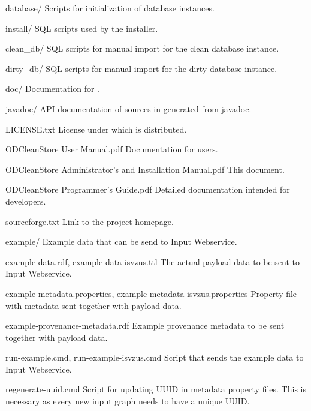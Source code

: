 \begin{dirlistbrief}
    \item[database/] Scripts for initialization of database instances.
        \begin{dirlist}
            \item[install/] SQL scripts used by the installer.
            \item[clean\_db/] SQL scripts for manual import for the clean database instance.
            \item[dirty\_db/] SQL scripts for manual import for the dirty database instance.
        \end{dirlist}
    \item[doc/] Documentation for \odcs.
        \begin{dirlist}
            \item[javadoc/] API documentation of \odcs sources in generated from javadoc.
            \item[LICENSE.txt] License under which \odcs is distributed.
            \item[ODCleanStore User Manual.pdf] Documentation for \odcs users.
            \item[ODCleanStore Administrator's and Installation Manual.pdf] This document.
            \item[ODCleanStore Programmer's Guide.pdf] Detailed documentation intended for developers.
            \item[sourceforge.txt] Link to the project homepage.
        \end{dirlist}
    \item[example/] Example data that can be send to Input Webservice.
        \begin{dirlist}
            \item[example-data.rdf, example-data-isvzus.ttl] The actual payload data to be sent to Input Webservice.
            \item[example-metadata.properties, example-metadata-isvzus.properties] Property file with metadata sent together with payload data.
            \item[example-provenance-metadata.rdf] Example provenance metadata to be sent together with payload data.
            \item[run-example.cmd, run-example-isvzus.cmd] Script that sends the example data to Input Webservice.
            \item[regenerate-uuid.cmd] Script for updating UUID in metadata property files. This is necessary as every new input graph needs to have a unique UUID.
        \end{dirlist}

\end{dirlistbrief}
